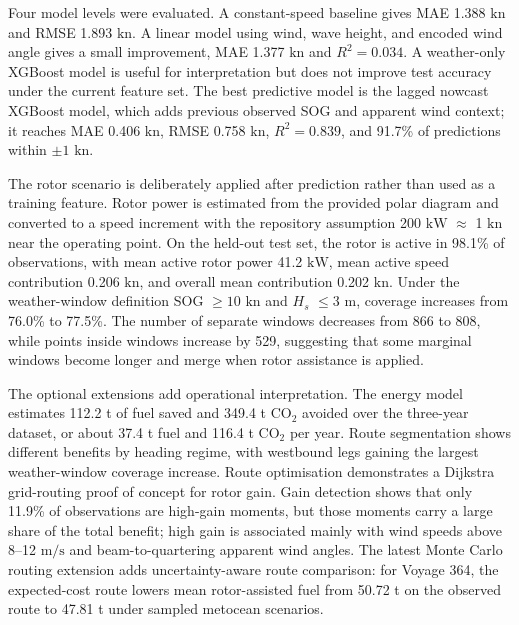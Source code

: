 \documentclass[10pt,a4paper]{article}
\newcommand{\kn}{\ensuremath{\mathrm{kn}}}
\newcommand{\ms}{\ensuremath{\mathrm{m/s}}}
\newcommand{\kw}{\ensuremath{\mathrm{kW}}}
\newcommand{\co}{CO$_2$}
\newcommand{\hs}{$H_s$}
\newcommand{\sog}{SOG}
\begin{document}
Four model levels were evaluated. A constant-speed baseline gives MAE
1.388 \kn{} and RMSE 1.893 \kn{}. A linear model using wind, wave height, and
encoded wind angle gives a small improvement, MAE 1.377 \kn{} and $R^2=0.034$.
A weather-only XGBoost model is useful for interpretation but does not improve
test accuracy under the current feature set. The best predictive model is the
lagged nowcast XGBoost model, which adds previous observed \sog{} and apparent
wind context; it reaches MAE 0.406 \kn{}, RMSE 0.758 \kn{}, $R^2=0.839$, and
91.7\% of predictions within $\pm 1$ \kn{}.

The rotor scenario is deliberately applied after prediction rather than used as
a training feature. Rotor power is estimated from the provided polar diagram and
converted to a speed increment with the repository assumption
200 \kw{} $\approx$ 1 \kn{} near the operating point. On the held-out test set,
the rotor is active in 98.1\% of observations, with mean active rotor power
41.2 \kw{}, mean active speed contribution 0.206 \kn{}, and overall mean
contribution 0.202 \kn{}. Under the weather-window definition
\sog{} $\geq 10$ \kn{} and \hs{} $\leq 3$ m, coverage increases from 76.0\% to
77.5\%. The number of separate windows decreases from 866 to 808, while points
inside windows increase by 529, suggesting that some marginal windows become
longer and merge when rotor assistance is applied.

The optional extensions add operational interpretation. The energy model
estimates 112.2 t of fuel saved and 349.4 t \co{} avoided over the three-year
dataset, or about 37.4 t fuel and 116.4 t \co{} per year. Route segmentation
shows different benefits by heading regime, with westbound legs gaining the
largest weather-window coverage increase. Route optimisation demonstrates a
Dijkstra grid-routing proof of concept for rotor gain. Gain detection shows that
only 11.9\% of observations are high-gain moments, but those moments carry a
large share of the total benefit; high gain is associated mainly with wind
speeds above 8--12 \ms{} and beam-to-quartering apparent wind angles. The latest
Monte Carlo routing extension adds uncertainty-aware route comparison: for
Voyage 364, the expected-cost route lowers mean rotor-assisted fuel from
50.72 t on the observed route to 47.81 t under sampled metocean scenarios.
\end{document}
